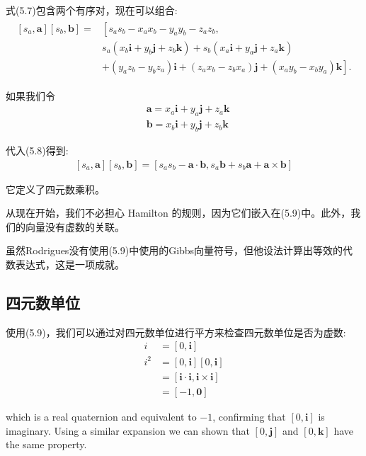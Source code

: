 式(5.7)包含两个有序对，现在可以组合:
\begin{align}
    \begin{aligned}
        {\left[s_{a}, \mathbf{a}\right]\left[s_{b}, \mathbf{b}\right]=} & {\left[s_{a} s_{b}-x_{a} x_{b}-y_{a} y_{b}-z_{a} z_{b},\right.} \\
        & s_{a}\left(x_{b} \mathbf{i}+y_{b} \mathbf{j}+z_{b} \mathbf{k}\right)+s_{b}\left(x_{a} \mathbf{i}+y_{a} \mathbf{j}+z_{a} \mathbf{k}\right) \\
        & \left.+\left(y_{a} z_{b}-y_{b} z_{a}\right) \mathbf{i}+\left(z_{a} x_{b}-z_{b} x_{a}\right) \mathbf{j}+\left(x_{a} y_{b}-x_{b} y_{a}\right) \mathbf{k}\right] .
    \end{aligned}
\end{align}

如果我们令
$$
\begin{aligned}
& \mathbf{a}=x_{a} \mathbf{i}+y_{a} \mathbf{j}+z_{a} \mathbf{k} \\
& \mathbf{b}=x_{b} \mathbf{i}+y_{b} \mathbf{j}+z_{b} \mathbf{k}
\end{aligned}
$$

代入(5.8)得到:
\begin{align}
    \left[s_{a}, \mathbf{a}\right]\left[s_{b}, \mathbf{b}\right]=\left[s_{a} s_{b}-\mathbf{a} \cdot \mathbf{b}, s_{a} \mathbf{b}+s_{b} \mathbf{a}+\mathbf{a} \times \mathbf{b}\right]
\end{align}

它定义了四元数乘积。

从现在开始，我们不必担心 Hamilton 的规则，因为它们嵌入在(5.9)中。此外，我们的向量没有虚数的关联。

虽然Rodrigues没有使用(5.9)中使用的Gibbs向量符号，但他设法计算出等效的代数表达式，这是一项成就。

\subsection{四元数单位}
使用(5.9)，我们可以通过对四元数单位进行平方来检查四元数单位是否为虚数:
$$
\begin{aligned}
i & =[0, \mathbf{i}] \\
i^{2} & =[0, \mathbf{i}][0, \mathbf{i}] \\
& =[\mathbf{i} \cdot \mathbf{i}, \mathbf{i} \times \mathbf{i}] \\
& =[-1, \mathbf{0}]
\end{aligned}
$$

which is a real quaternion and equivalent to $-1$, confirming that $[0, \mathbf{i}]$ is imaginary. Using a similar expansion we can shown that $[0, \mathbf{j}]$ and $[0, \mathbf{k}]$ have the same property.

